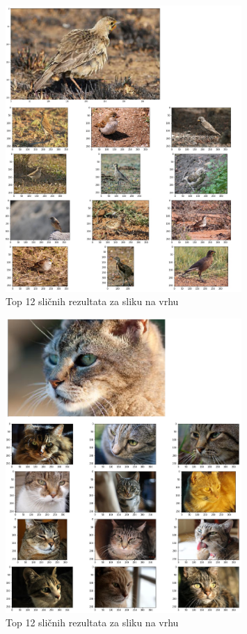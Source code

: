 \documentclass[times, utf8, proizvoljni, numeric]{fer}
\begin{document}
\begin{figure}[H]
	\begin{center}
		\captionsetup{justification=centering}
		\includegraphics[width=0.8\textwidth]{./imgs/inception_globalno_sazimanje_ptice.png}
		\caption{Top 12 sličnih rezultata za sliku na vrhu}
		\label{fg:inception_globalno_sazimanje_ptice}
	\end{center}
\end{figure}


\begin{figure}[H]
	\begin{center}
		\captionsetup{justification=centering}
		\includegraphics[width=0.8\textwidth]{./imgs/inception_globalno_sazimanje_macke.png}
		\caption{Top 12 sličnih rezultata za sliku na vrhu}
		\label{fg:inception_globalno_sazimanje_macke}
	\end{center}
\end{figure}
\end{document}
